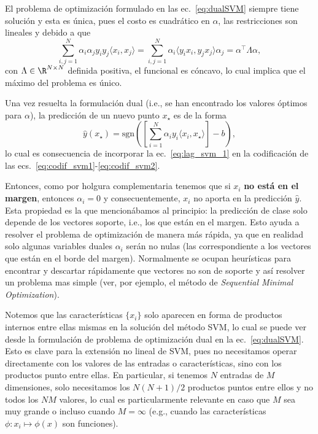 \begin{remark}
    El problema de optimización formulado en las ec.~\eqref{eq:dualSVM} siempre tiene solución y esta es única, pues el costo es cuadrático en $\alpha$, las restricciones son lineales y debido a que
    \begin{equation}
         \sum\limits_{i,j=1}^{N} \alpha_i \alpha_j y_i y_j \langle x_i, x_j\rangle = \sum\limits_{i,j=1}^{N}  \alpha_i \langle   y_i x_i,  y_jx_j\rangle \alpha_j = \alpha^\top \Lambda \alpha,
     \end{equation}
     con $\Lambda\in\R^{N\times N}$ definida positiva,  el funcional es cóncavo, lo cual implica que el máximo del problema es único. 
\end{remark}

Una vez resuelta la formulación dual (i.e., se han encontrado los valores óptimos para $\alpha$), la predicción de un nuevo punto $x_\star$ es de la forma 
\begin{equation}
 	\hat{y}(x_\star)= \text{sgn}\left(\left[\sum\limits_{i=1}^{N} \alpha_i y_i \langle x_i, x_\star\rangle\right] - b\right),
 \end{equation}
 lo cual es consecuencia de incorporar la ec.~\eqref{eq:lag_svm_1} en la codificación de las ecs.~\eqref{eq:codif_svm1}-\eqref{eq:codif_svm2}.

Entonces, como por holgura complementaria tenemos que si $x_i$ \textbf{no está en el margen}, entonces $\alpha_i = 0$ y consecuentemente, $x_i$ no aporta en la predicción $\hat{y}$. Esta propiedad es la que mencionábamos al principio: la predicción de clase solo depende de los vectores soporte, i.e., los que están en el margen. Esto ayuda a resolver el problema de optimización de manera más rápida, ya que en realidad solo algunas variables duales $\alpha_i$ serán no nulas (las correspondiente a los vectores que están en el borde del margen). Normalmente se ocupan heurísticas para encontrar y descartar rápidamente que vectores no son de soporte y así resolver un problema mas simple (ver, por ejemplo, el método de \emph{Sequential Minimal Optimization}). 


\begin{remark} Notemos que las características $\{x_i\}$ solo aparecen en forma de productos internos entre ellas mismas en la solución del método SVM, lo cual se puede ver desde la formulación de problema de optimización dual en la ec.~\eqref{eq:dualSVM}. Esto es clave para la extensión no lineal de SVM, pues no necesitamos operar directamente  con los valores de las entradas o características, sino con los productos punto entre ellas. En particular, si tenemos $N$ entradas de $M$ dimensiones, solo necesitamos los $N(N+1)/2$ productos puntos entre ellos y no todos los $NM$ valores, lo cual es particularmente relevante en caso que $M$ sea muy grande o incluso cuando $M=\infty$ (e.g., cuando las características $\phi:x_i\mapsto \phi(x)$ son funciones).
\end{remark} 

